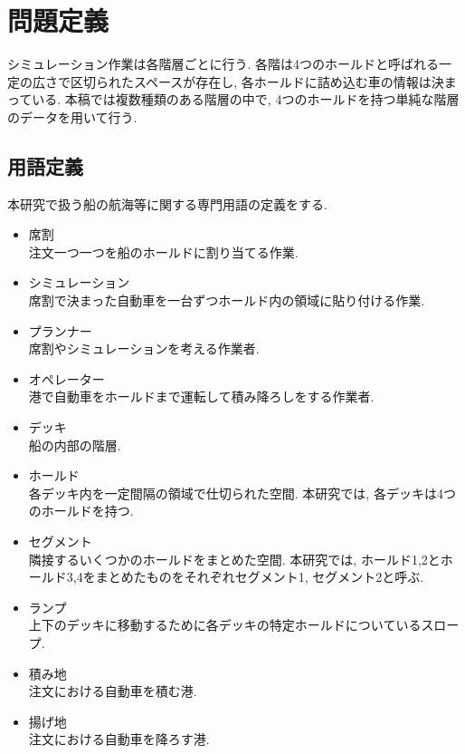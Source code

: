 \chapter{問題定義}\label{definition}

シミュレーション作業は各階層ごとに行う. 
各階は4つのホールドと呼ばれる一定の広さで区切られたスペースが存在し, 各ホールドに詰め込む車の情報は決まっている. 
本稿では複数種類のある階層の中で, 4つのホールドを持つ単純な階層のデータを用いて行う. 


\section{用語定義}
本研究で扱う船の航海等に関する専門用語の定義をする\cite{takeda}.

\begin{itemize}
    \item 席割 \\
    注文一つ一つを船のホールドに割り当てる作業.

    \item シミュレーション \\
    席割で決まった自動車を一台ずつホールド内の領域に貼り付ける作業.

    \item  プランナー \\
    席割やシミュレーションを考える作業者.

    \item  オペレーター\\
    港で自動車をホールドまで運転して積み降ろしをする作業者.

    \item デッキ \\
    船の内部の階層.

    \item ホールド \\
    各デッキ内を一定間隔の領域で仕切られた空間. 
    本研究では, 各デッキは4つのホールドを持つ. 

    \item セグメント \\
    隣接するいくつかのホールドをまとめた空間. 
    本研究では, ホールド1,2とホールド3,4をまとめたものをそれぞれセグメント1, セグメント2と呼ぶ. 

    \item ランプ \\
    上下のデッキに移動するために各デッキの特定ホールドについているスロープ.

    \item 積み地 \\
    注文における自動車を積む港.

    \item 揚げ地 \\
    注文における自動車を降ろす港.

\end{itemize}


